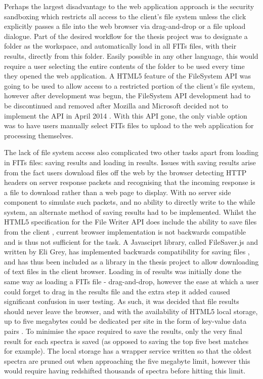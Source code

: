 \documentclass[titlesmallcaps, examinerscopy, copyrightpage]{uqthesis}
\begin{document}
Perhaps the largest disadvantage to the web application approach is the security sandboxing which restricts all access to the client's file system unless the click explicitly passes a file into the web browser via drag-and-drop or a file upload dialogue. Part of the desired workflow for the thesis project was to designate a folder as the workspace, and automatically load in all FITs files, with their results, directly from this folder. Easily possible in any other language, this would require a user selecting the entire contents of the folder to be used every time they opened the web application. A HTML5 feature of the FileSystem API was going to be used to allow access to a restricted portion of the client's file system, however after development was begun, the FileSystem API development had to be discontinued and removed after Mozilla and Microsoft decided not to implement the API in April 2014 \cite{filesystem}. With this API gone, the only viable option was to have users manually select FITs files to upload to the web application for processing themselves.

The lack of file system access also complicated two other tasks apart from loading in FITs files: saving results and loading in results. Issues with saving results arise from the fact users download files off the web by the browser detecting HTTP headers on server response packets and recognising that the incoming response is a file to download rather than a web page to display. With no server side component to simulate such packets, and no ability to directly write to the while system, an alternate method of saving results had to be implemented. Whilst the HTML5 specification for the File Writer API does include the ability to save files from the client \cite{save1}, current browser implementation is not backwards compatible and is thus not sufficient for the task. A Javasciprt library, called FileSaver.js and written by Eli Grey, has implemented backwards compatibility for saving files \cite{save2}, and has thus been included as a library in the thesis project to allow downloading of text files in the client browser. Loading in of results was initially done the same way as loading a FITs file - drag-and-drop, however the ease at which a user could forget to drag in the results file and the extra step it added caused significant confusion in user testing. As such, it was decided that file results should never leave the browser, and with the availability of HTML5 local storage, up to five megabytes could be dedicated per site in the form of key-value data pairs \cite{local}. To minimise the space required to save the results, only the very final result for each spectra is saved (as opposed to saving the top five best matches for example). The local storage has a wrapper service written so that the oldest spectra are pruned out when approaching the five megabyte limit, however this would require having redshifted thousands of spectra before hitting this limit.
\end{document}
